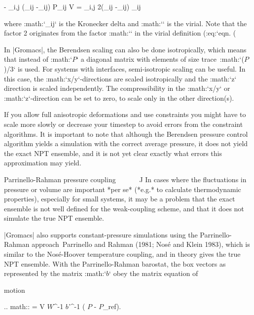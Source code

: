 {   - \sum_{i,j} (\mu_{ij} -\delta_{ij}) P_{ij} V =
   \sum_{i,j} 2(\mu_{ij} -\delta_{ij}) \Xi_{ij}

where :math:`\delta_{ij}` is the Kronecker delta and :math:`{\bf \Xi}`
is the virial. Note that the factor 2 originates from the factor
:math:`` in the virial definition
(:eq:`eqn. (%

In |Gromacs|, the Berendsen scaling can also be done isotropically, which
means that instead of :math:`{\mbox{\boldmath ${P}$}}` a diagonal matrix
with elements of size trace\ :math:`({\mbox{\boldmath ${P}$}})/3` is
used. For systems with interfaces, semi-isotropic scaling can be useful.
In this case, the :math:`x/y`-directions are scaled isotropically and
the :math:`z` direction is scaled independently. The compressibility in
the :math:`x/y` or :math:`z`-direction can be set to zero, to scale only
in the other direction(s).

If you allow full anisotropic deformations and use constraints you might
have to scale more slowly or decrease your timestep to avoid errors from
the constraint algorithms. It is important to note that although the
Berendsen pressure control algorithm yields a simulation with the
correct average pressure, it does not yield the exact NPT ensemble, and
it is not yet clear exactly what errors this approximation may yield.

Parrinello-Rahman pressure coupling
^^^^^^^^^^^^^^^^^^^^^^^^^^^^^^^^^^^

In cases where the fluctuations in pressure or volume are important *per
se* (*e.g.* to calculate thermodynamic properties), especially for small
systems, it may be a problem that the exact ensemble is not well defined
for the weak-coupling scheme, and that it does not simulate the true NPT
ensemble.

|Gromacs| also supports constant-pressure simulations using the
Parrinello-Rahman approach Parrinello and Rahman (1981; Nosé and Klein
1983), which is similar to the Nosé-Hoover temperature coupling, and in
theory gives the true NPT ensemble. With the Parrinello-Rahman barostat,
the box vectors as represented by the matrix
:math:`{\mbox{\boldmath ${b}$}}` obey the matrix equation of

motion

.. math:: = V {\mbox{\boldmath ${W}$}}^{-1} {\mbox{\boldmath ${b}$}}'^{-1} \left( {\mbox{\boldmath ${P}$}} - {\mbox{\boldmath ${P}$}}_{ref}\right).

}
